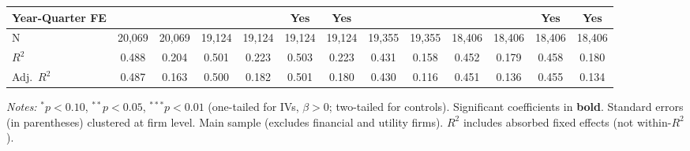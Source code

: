\begin{landscape}
\begin{table}[H]
\begin{tabular}{lcccccccccccc}
Year-Quarter FE &  &  &  &  & Yes & Yes &  &  &  &  & Yes & Yes \\
\midrule
N & 20,069 & 20,069 & 19,124 & 19,124 & 19,124 & 19,124 & 19,355 & 19,355 & 18,406 & 18,406 & 18,406 & 18,406 \\
$R^2$ & 0.488 & 0.204 & 0.501 & 0.223 & 0.503 & 0.223 & 0.431 & 0.158 & 0.452 & 0.179 & 0.458 & 0.180 \\
Adj.~$R^2$ & 0.487 & 0.163 & 0.500 & 0.182 & 0.501 & 0.180 & 0.430 & 0.116 & 0.451 & 0.136 & 0.455 & 0.134 \\
\bottomrule
\end{tabular}
\begin{minipage}{\linewidth}
\vspace{2pt}\scriptsize
\textit{Notes:} $^{*}p<0.10$, $^{**}p<0.05$, $^{***}p<0.01$ (one-tailed for IVs, $\beta > 0$; two-tailed for controls).
 Significant coefficients in \textbf{bold}.
 Standard errors (in parentheses) clustered at firm level.
 Main sample (excludes financial and utility firms).
 $R^2$ includes absorbed fixed effects (not within-$R^2$).
\end{minipage}
\end{table}
\end{landscape}